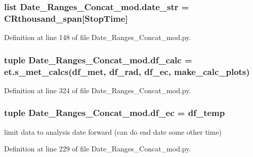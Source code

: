 \subsubsection[{date\+\_\+str}]{\setlength{\rightskip}{0pt plus 5cm}list Date\+\_\+\+Ranges\+\_\+\+Concat\+\_\+mod.\+date\+\_\+str = {\bf C\+Rthousand\+\_\+span}\mbox{[}\textquotesingle{}Stop\+Time\textquotesingle{}\mbox{]}}\label{namespace_date___ranges___concat__mod_a6a56c00d72f298edbcea63a9dc67ce73}


Definition at line 148 of file Date\+\_\+\+Ranges\+\_\+\+Concat\+\_\+mod.\+py.

\hypertarget{namespace_date___ranges___concat__mod_aad8fbbd6db9c248c585f95d71831cdde}{}
\subsubsection[{df\+\_\+calc}]{\setlength{\rightskip}{0pt plus 5cm}tuple Date\+\_\+\+Ranges\+\_\+\+Concat\+\_\+mod.\+df\+\_\+calc = et.\+s\+\_\+met\+\_\+calcs({\bf df\+\_\+met}, {\bf df\+\_\+rad}, {\bf df\+\_\+ec}, {\bf make\+\_\+calc\+\_\+plots})}\label{namespace_date___ranges___concat__mod_aad8fbbd6db9c248c585f95d71831cdde}


Definition at line 324 of file Date\+\_\+\+Ranges\+\_\+\+Concat\+\_\+mod.\+py.

\hypertarget{namespace_date___ranges___concat__mod_acfb2ddd0f9bcfb466d62ce1281fb904c}{}
\subsubsection[{df\+\_\+ec}]{\setlength{\rightskip}{0pt plus 5cm}tuple Date\+\_\+\+Ranges\+\_\+\+Concat\+\_\+mod.\+df\+\_\+ec = {\bf df\+\_\+temp}}\label{namespace_date___ranges___concat__mod_acfb2ddd0f9bcfb466d62ce1281fb904c}


limit data to analysis date forward (can do end date some other time) 



Definition at line 229 of file Date\+\_\+\+Ranges\+\_\+\+Concat\+\_\+mod.\+py.

